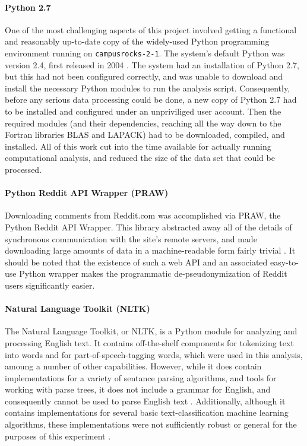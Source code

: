 \documentclass{article}
\begin{document}
\paragraph{Python 2.7}
One of the most challenging aspects of this project involved getting a functional and reasonably up-to-date copy of the widely-used Python programming environment running on \texttt{campusrocks-2-1}. The system's default Python was version 2.4, first released in 2004 \cite{python2004python}. The system had an installation of Python 2.7, but this had not been configured correctly, and was unable to download and install the necessary Python modules to run the analysis script. Consequently, before any serious data processing could be done, a new copy of Python 2.7 had to be installed and configured under an unpriviliged user account. Then the required modules (and their dependencies, reaching all the way down to the Fortran libraries BLAS and LAPACK) had to be downloaded, compiled, and installed. All of this work cut into the time available for actually running computational analysis, and reduced the size of the data set that could be processed.

\paragraph{Python Reddit API Wrapper (PRAW)}
Downloading comments from Reddit.com was accomplished via PRAW, the Python Reddit API Wrapper. This library abstracted away all of the details of synchronous communication with the site's remote servers, and made downloading large amounts of data in a machine-readable form fairly trivial \cite{boe2012python}. It should be noted that the existence of such a web API and an associated easy-to-use Python wrapper makes the programmatic de-pseudonymization of Reddit users significantly easier.

\paragraph{Natural Language Toolkit (NLTK)}
The Natural Language Toolkit, or NLTK, is a Python module for analyzing and processing English text. It contains off-the-shelf components for tokenizing text into words and for part-of-speech-tagging words, which were used in this analysis, amoung a number of other capabilities. However, while it does contain implementations for a variety of sentance parsing algorithms, and tools for working with parse trees, it does not include a grammar for English, and consequently cannot be used to parse English text \cite{bird2006nltk}. Additionally, although it contains implementations for several basic text-classification machine learning algorithms, these implementations were not sufficiently robust or general for the purposes of this experiment \cite{nltk2012classify}.
\end{document}
